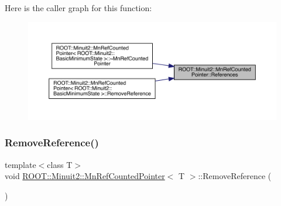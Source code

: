 Here is the caller graph for this function\+:
\nopagebreak
\begin{figure}[H]
\begin{center}
\leavevmode
\includegraphics[width=350pt]{d5/d13/classROOT_1_1Minuit2_1_1MnRefCountedPointer_acffac58848d817d7747631954daf3e0c_icgraph}
\end{center}
\end{figure}
\mbox{\label{classROOT_1_1Minuit2_1_1MnRefCountedPointer_a8e348ffb51b9ed7793cce28e6330309f}} 
\subsubsection{\texorpdfstring{RemoveReference()}{RemoveReference()}\hspace{0.1cm}{\footnotesize\ttfamily [1/3]}}
{\footnotesize\ttfamily template$<$class T$>$ \\
void \mbox{\hyperlink{classROOT_1_1Minuit2_1_1MnRefCountedPointer}{R\+O\+O\+T\+::\+Minuit2\+::\+Mn\+Ref\+Counted\+Pointer}}$<$ T $>$\+::Remove\+Reference (\begin{DoxyParamCaption}{ }\end{DoxyParamCaption})\hspace{0.3cm}{\ttfamily [inline]}}

